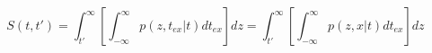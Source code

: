 \begin{equation}
S(t,t') = \int_{t'}^{\infty} \left[ \int_{-\infty}^\infty p(z,t_{ex}|t) dt_{ex}\right] dz =\int_{t'}^{\infty} \left[ \int_{-\infty}^\infty p(z,x|t) dt_{ex}\right] dz
\end{equation}